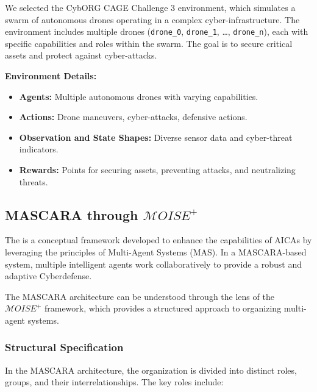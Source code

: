 \documentclass[conference]{IEEEtran}
\newcounter{relation}
\begin{document}
We selected the CybORG CAGE Challenge 3 environment, which simulates a swarm of autonomous drones operating in a complex cyber-infrastructure. The environment includes multiple drones (\texttt{drone\_0}, \texttt{drone\_1}, \ldots, \texttt{drone\_n}), each with specific capabilities and roles within the swarm. The goal is to secure critical assets and protect against cyber-attacks.

\textbf{Environment Details:}
\begin{itemize}
    \item \textbf{Agents:} Multiple autonomous drones with varying capabilities.
    \item \textbf{Actions:} Drone maneuvers, cyber-attacks, defensive actions.
    \item \textbf{Observation and State Shapes:} Diverse sensor data and cyber-threat indicators.
    \item \textbf{Rewards:} Points for securing assets, preventing attacks, and neutralizing threats.
\end{itemize}


\subsection{MASCARA through $\mathcal{M}OISE^+$}

The is a conceptual framework developed to enhance the capabilities of AICAs by leveraging the principles of Multi-Agent Systems (MAS). In a MASCARA-based system, multiple intelligent agents work collaboratively to provide a robust and adaptive Cyberdefense.

The MASCARA architecture can be understood through the lens of the $\mathcal{M}OISE^+$ framework, which provides a structured approach to organizing multi-agent systems.

\subsubsection*{Structural Specification}

In the MASCARA architecture, the organization is divided into distinct roles, groups, and their interrelationships. The key roles include:
\end{document}
